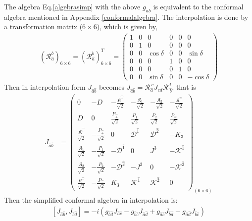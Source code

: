 \documentclass[%
 reprint,
superscriptaddress,
 amsmath,amssymb,
 aps,
]{revtex4-2}
\newcommand{\itP}[1]{\hat{#1}}
\begin{document}
The algebra Eq.\eqref{algebrasimp} with the above $g_{ab}$ is equivalent to the conformal algebra mentioned in Appendix \ref{conformalalgebra}. The interpolation is done by a transformation matrix ($6\times6$), which is given by,
\begin{align}
    (\mathcal{R}_{\hat{a}}^{b})_{6\times6}=(\mathcal{R}_{\hat{a}}^{b})^T_{6\times6}=\begin{pmatrix}
    1&0&0&0&0&0\\
    0&1&0&0&0&0\\
    0&0&\cos{\delta}&0&0&\sin{\delta}\\
    0&0&0&1&0&0\\
    0&0&0&0&1&0\\
    0&0&\sin{\delta}&0&0&-\cos{\delta}
    \end{pmatrix}
\end{align}
Then in interpolation form $J_{\hat{a}\hat{b}}$ becomes $J_{\hat{a}\hat{b}}=\mathcal{R}_{\hat{a}}^{~{c}}J_{cd}\mathcal{R}_{~\hat{b}}^{{d}}$, that is
\begin{align}
    J_{\hat{a}\hat{b}}&=\begin{pmatrix}
    0&-D&-\frac{\mathfrak{K}^{\hat{+}}}{\sqrt{2}}&-\frac{\mathfrak{K}_1}{\sqrt{2}}&-\frac{\mathfrak{K}_2}{\sqrt{2}}&-\frac{\mathfrak{K}^{\hat{-}}}{\sqrt{2}}\\
    D&0&\frac{P_{\hat{+}}}{\sqrt{2}}&\frac{P_{1}}{\sqrt{2}}&\frac{P_{2}}{\sqrt{2}}&\frac{P_{\hat{-}}}{\sqrt{2}}\\
    \frac{\mathfrak{K}^{\hat{+}}}{\sqrt{2}}&-\frac{P_{\hat{+}}}{\sqrt{2}}&0 & {\mathcal{D}}^{\itP{1}} & {\mathcal{D}}^{\itP{2}} & -K_3\\
    \frac{\mathfrak{K}_1}{\sqrt{2}}&-\frac{P_{1}}{\sqrt{2}}&-{\mathcal{D}}^{\itP{1}} & 0 & {J}^{3} & -{\mathcal{K}}^{\itP{1}}\\
    \frac{\mathfrak{K}_2}{\sqrt{2}}&-\frac{P_{2}}{\sqrt{2}}&-{\mathcal{D}}^{\itP{2}} & -{J}^{3} & 0 & -{\mathcal{K}}^{\itP{2}}\\
    \frac{\mathfrak{K}^{\hat{-}}}{\sqrt{2}}&-\frac{P_{\hat{-}}}{\sqrt{2}}&K_3 & {\mathcal{K}}^{\itP{1}} & {\mathcal{K}}^{\itP{2}} & 0
  \end{pmatrix}_{(6\times6)}\label{Jhat+hat-}
\end{align}
Then the simplified conformal algebra in interpolation is:
  \begin{align}
      \left[J_{{\hat{a}}{\hat{b}}},J_{{\hat{c}}{\hat{d}}}\right]=-i\left(g_{{\hat{b}}{\hat{d}}}J_{{\hat{a}}{\hat{c}}}-g_{{\hat{b}}{\hat{c}}}J_{{\hat{a}}{\hat{d}}}+g_{{\hat{a}}{\hat{c}}}J_{{\hat{b}}{\hat{d}}}-g_{{\hat{a}}{\hat{d}}}J_{{\hat{b}}{\hat{c}}}\right)\label{simplesrint}
  \end{align}
\end{document}
